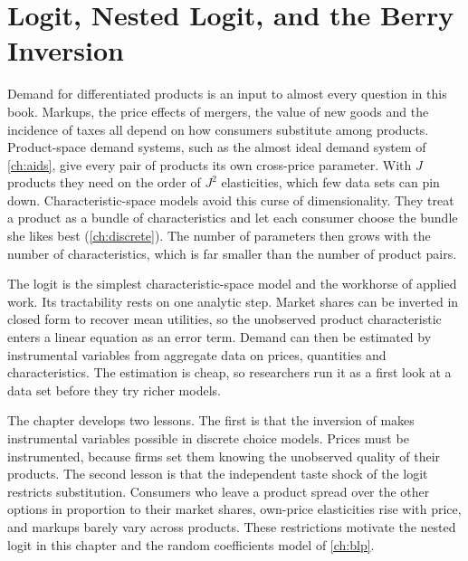 \chapter{Logit, Nested Logit, and the Berry Inversion}\label{ch:logit}

Demand for differentiated products is an input to almost every question in this book. Markups, the price effects
of mergers, the value of new goods and the incidence of taxes all depend on how consumers substitute among
products. Product-space demand systems, such as the almost ideal demand system of \cref{ch:aids}, give every pair
of products its own cross-price parameter. With $J$ products they need on the order of $J^2$ elasticities, which
few data sets can pin down. Characteristic-space models avoid this curse of dimensionality. They treat a product
as a bundle of characteristics and let each consumer choose the bundle she likes best (\cref{ch:discrete}). The
number of parameters then grows with the number of characteristics, which is far smaller than the number of
product pairs.

The logit is the simplest characteristic-space model and the workhorse of applied work. Its tractability rests on
one analytic step. Market shares can be inverted in closed form to recover mean utilities, so the unobserved
product characteristic enters a linear equation as an error term. Demand can then be estimated by instrumental
variables from aggregate data on prices, quantities and characteristics. The estimation is cheap, so researchers
run it as a first look at a data set before they try richer models.

The chapter develops two lessons. The first is that the inversion of \citet{Berry1994} makes instrumental variables
possible in discrete choice models. Prices must be instrumented, because firms set them knowing the unobserved
quality of their products. The second lesson is that the independent taste shock of the logit restricts
substitution. Consumers who leave a product spread over the other options in proportion to their market shares,
own-price elasticities rise with price, and markups barely vary across products. These restrictions motivate the
nested logit in this chapter and the random coefficients model of \cref{ch:blp}.

